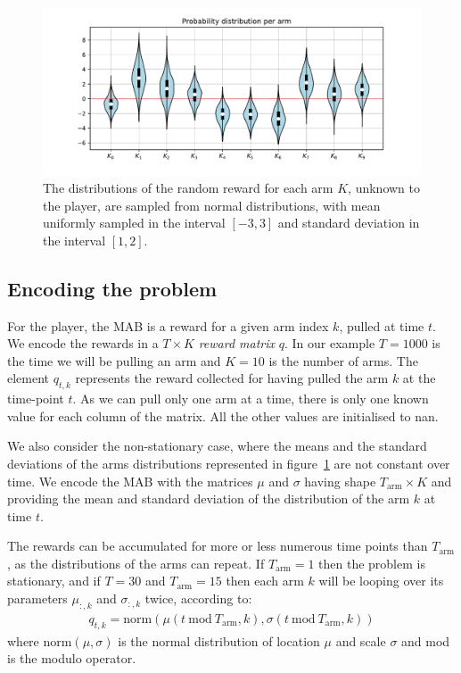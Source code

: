 \documentclass[]{scrartcl}
\theoremstyle{definition}
\begin{document}
\begin{figure}[h]
    \hspace{-1.5cm}
    \includegraphics[width=18cm]{figures/initial_distributions.pdf}
    \caption{The distributions of the random reward for each arm $K$, unknown to the player, are sampled from normal distributions, with mean uniformly sampled in the interval $[-3, 3]$ and standard deviation in the interval $[1, 2]$.}
    \label{fig:volin_plot}
\end{figure}

\subsection*{Encoding the problem}
For the player, the MAB is a reward for a given arm index $k$, pulled at time $t$. We encode the rewards in a $T\times K$ \emph{reward matrix} $q$. In our example $T=1000$ is the time we will be pulling an arm and $K=10$ is the number of arms. The element $q_{t, k}$ represents the reward collected for having pulled the arm $k$ at the time-point $t$. As we can pull only one arm at a time, there is only one known value for each column of the matrix. All the other values are initialised to nan.

We also consider the non-stationary case, where the means and the standard deviations of the arms distributions represented in figure~\ref{fig:volin_plot} are not constant over time. We encode  the MAB with the matrices $\mu$ and $\sigma$ having shape $T_{\text{arm}} \times K$ and providing the mean and standard deviation of the distribution of the arm $k$ at time $t$.

The rewards can be accumulated for more or less numerous time points than $T_{\text{arm}}$, as the distributions of the arms can repeat. If $T_{\text{arm}}=1$ then the problem is stationary, and if $T=30$ and $T_{\text{arm}}=15$ then each arm $k$ will be looping over its parameters $\mu_{:, k}$ and $\sigma_{:, k}$ twice, according to:
\begin{align*}
q_{t, k}
=
\text{norm}\left(\mu({t~\text{mod}~T_{\text{arm}}, k}), \sigma({t~\text{mod}~T_{\text{arm}}, k})\right)
\end{align*}
where $\text{norm}(\mu, \sigma)$ is the normal distribution of location $\mu$ and scale $\sigma$ and mod is the modulo operator.
\end{document}
